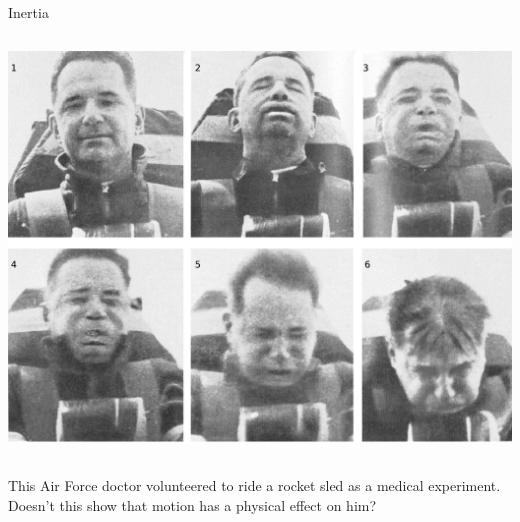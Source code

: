 \begin{frame}{Inertia}
  \begin{mycolumns}

    \begin{column}{.7\textwidth}\includegraphics[width=7in]{ch01/figs/rocket-sled}\end{column}

    \begin{column}{.3\textwidth}
      \dq

      This Air Force doctor volunteered to ride a rocket sled as
      a medical experiment. Doesn't this show that motion has a physical effect on him?

    \end{column}
  \end{mycolumns}
\end{frame}

